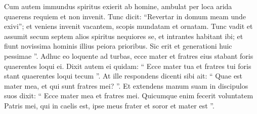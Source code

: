 \begin{biblechapter}
\begin{biblechapter}
\begin{biblechapter}
\begin{biblechapter}
\begin{biblechapter}
\begin{biblechapter}
\begin{biblechapter}
\begin{biblechapter}
\begin{biblechapter}
\begin{biblechapter}
\begin{biblechapter}
\begin{biblechapter}
 \verse Cum autem immundus spiritus exierit ab homine, ambulat per loca arida quaerens requiem et non invenit. 
\verse Tunc dicit: “Revertar in domum meam unde exivi”; et veniens invenit vacantem, scopis mundatam et ornatam. 
\verse Tunc vadit et assumit secum septem alios spiritus nequiores se, et intrantes habitant ibi; et fiunt novissima hominis illius peiora prioribus. Sic erit et generationi huic pessimae ”.
 \verse Adhuc eo loquente ad turbas, ecce mater et fratres eius stabant foris quaerentes loqui ei. 
\verse Dixit autem ei quidam: “ Ecce mater tua et fratres tui foris stant quaerentes loqui tecum ”. 
\verse At ille respondens dicenti sibi ait: “ Quae est mater mea, et qui sunt fratres mei? ”. 
\verse Et extendens manum suam in discipulos suos dixit: “ Ecce mater mea et fratres mei. 
\verse Quicumque enim fecerit voluntatem Patris mei, qui in caelis est, ipse meus frater et soror et mater est ”.
 

\end{biblechapter}
\end{biblechapter}
\end{biblechapter}
\end{biblechapter}
\end{biblechapter}
\end{biblechapter}
\end{biblechapter}
\end{biblechapter}
\end{biblechapter}
\end{biblechapter}
\end{biblechapter}
\end{biblechapter}
